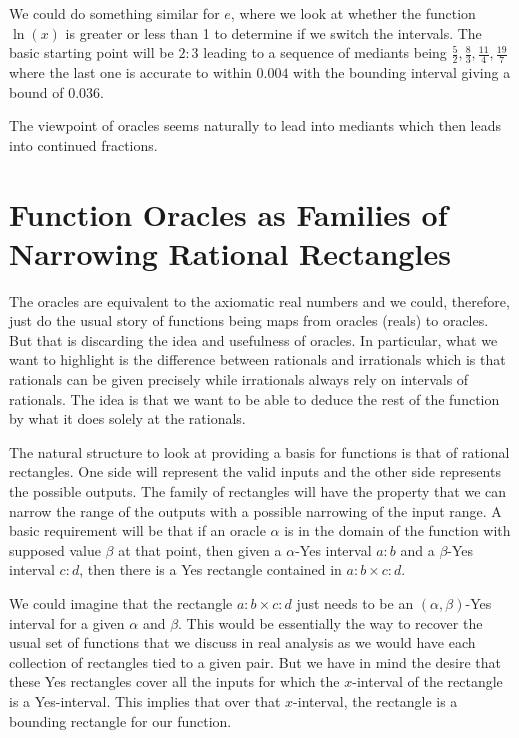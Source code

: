 \documentclass[12pt]{article}
\theoremstyle{remark}
\begin{document}
We could do something similar for $e$, where we look at whether the function $\ln(x)$ is greater or less than 1 to determine if we switch the intervals. The basic starting point will be $2:3$ leading to a sequence of mediants being $\frac{5}{2}, \frac{8}{3}, \frac{11}{4}, \frac{19}{7}$ where the last one is accurate to within $0.004$ with the bounding interval giving a bound of $0.036$. 

The viewpoint of oracles seems naturally to lead into mediants which then leads into continued fractions. 

\section{Function Oracles as Families of Narrowing Rational Rectangles}\label{sec:funora}

The oracles are equivalent to the axiomatic real numbers and we could, therefore, just do the usual story of functions being maps from oracles (reals) to oracles. But that is discarding the idea and usefulness of oracles. In particular, what we want to highlight is the difference between rationals and irrationals which is that rationals can be given precisely while irrationals always rely on intervals of rationals. The idea is that we want to be able to deduce the rest of the function by what it does solely at the rationals. 

The natural structure to look at providing a basis for functions is that of rational rectangles. One side will represent the valid inputs and the other side represents the possible outputs. The family of rectangles will have the property that we can narrow the range of the outputs with a possible narrowing of the input range. A basic requirement will be that if an oracle $\alpha$ is in the domain of the function with supposed value $\beta$ at that point, then given a $\alpha$-Yes interval $a:b$ and a $\beta$-Yes interval $c:d$, then there is a Yes rectangle contained in $a:b \times c:d$. 

We could imagine that the rectangle $a:b \times c:d$ just needs to be an $(\alpha, \beta)$-Yes interval for a given $\alpha$ and $\beta$. This would be essentially the way to recover the usual set of functions that we discuss in real analysis as we would have each collection of rectangles tied to a given pair. But we have in mind the desire that these Yes rectangles cover all the inputs for which the $x$-interval of the rectangle is a Yes-interval. This implies that over that $x$-interval, the rectangle is a bounding rectangle for our function. 
\end{document}
